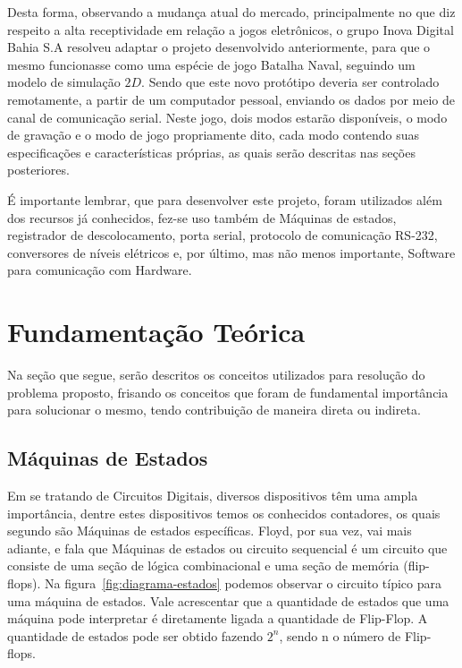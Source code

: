 \documentclass[12pt]{article}
\begin{document}
Desta forma, observando a mudança atual do mercado, principalmente no que diz respeito a alta receptividade em relação a jogos eletrônicos, o grupo Inova Digital Bahia S.A  resolveu adaptar o projeto desenvolvido anteriormente, para que o mesmo funcionasse como uma espécie de jogo Batalha Naval, seguindo um modelo de simulação $2D$. Sendo que este novo protótipo deveria ser controlado remotamente, a partir de um computador pessoal, enviando os dados por meio de canal de comunicação serial. Neste jogo, dois modos estarão disponíveis, o modo de gravação e o modo de jogo propriamente dito, cada modo contendo suas especificações e características próprias, as quais serão descritas nas seções posteriores.

É importante lembrar, que para desenvolver este projeto, foram utilizados além dos recursos já conhecidos, fez-se uso também de Máquinas de estados, registrador de descolocamento, porta serial, protocolo de comunicação RS-232, conversores de níveis elétricos e, por último, mas não menos importante, Software para comunicação com Hardware.

\section{Fundamentação Teórica}

Na seção que segue, serão descritos os conceitos utilizados para resolução do problema proposto, frisando os conceitos que foram de fundamental importância para solucionar o mesmo, tendo contribuição de maneira direta ou indireta.

\subsection{Máquinas de Estados}
Em se tratando de Circuitos Digitais, diversos dispositivos têm uma ampla importância, dentre estes dispositivos temos os conhecidos contadores, os quais segundo\cite{tocci1997digital} são Máquinas de estados específicas. Floyd, por sua vez, vai mais adiante, e fala que Máquinas de estados ou circuito sequencial é um circuito que  consiste de uma seção de lógica combinacional e uma seção de memória (flip-flops)\cite{floyd2011digital}. Na figura~\ref{fig:diagrama-estados} podemos observar o circuito típico para uma máquina de estados. Vale acrescentar que a quantidade de estados que uma máquina pode interpretar é diretamente ligada a quantidade de Flip-Flop. A quantidade de estados pode ser obtido fazendo $2^{n}$, sendo n o número de Flip-flops.  
\end{document}
